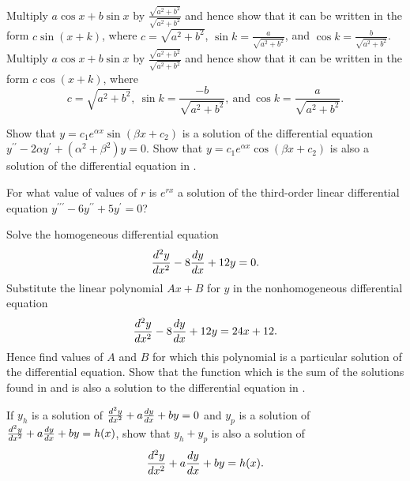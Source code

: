 \begin{exercises}
\begin{exenum}
\x
Multiply $a \cos x + b \sin x$ by
$\frac{\sqrt{a^2+b^2}}{\sqrt{a^2+b^2}}$
and hence show that it can be written in the form
$c \sin (x+k)$, where $c = \sqrt{a^2+b^2}$,
$\sin k = \frac a{\sqrt{a^2+b^2}}$, and
$\cos k = \frac b{\sqrt{a^2+b^2}}$.
\x
Multiply $a \cos x + b \sin x$ by
$\frac{\sqrt{a^2+b^2}}{\sqrt{a^2+b^2}}$
and hence show that it can be written in the form
$c \cos(x+k)$, where
\[
c = \sqrt{a^2+b^2},\:\sin k = \frac{-b}{\sqrt{a^2+b^2}},
\:\mbox{and}\: \cos k = \frac{a}{\sqrt{a^2+b^2}}
.
\]
\end{exenum}

\begin{exenum}
\x
{}
Show that $y = c_1e^{\alpha x}\sin(\beta x+c_2)$
is a solution of the differential equation
$y^{\prime\prime} - 2\alpha y^\prime +
(\alpha^2+\beta^2)y = 0$.
\x
Show that $y = c_1e^{\alpha x}\cos(\beta x+c_2)$
is also a solution of the differential equation
in .
\end{exenum}

For what value of values of $r$ is $e^{rx}$
a solution of the third-order linear differential
equation
$y^{\prime\prime\prime} -6y^{\prime\prime}
+ 5y^\prime = 0$?

\begin{exenum}
\x
{}
Solve the homogeneous differential equation
\[
\frac{d^{2}{y}}{dx^{2}} - 8 \frac{d y}{d x} + 12y = 0
.
\]
\x
{}
Substitute the linear polynomial $Ax+B$ for $y$
in the nonhomogeneous differential equation
\[
\frac{d^{2}{y}}{dx^{2}} - 8\frac{d y}{d x} + 12y = 24x + 12
.
\]
Hence find values of $A$ and $B$ for which
this polynomial is a particular solution
of the differential equation.
\x
Show that the function which is the sum of the
solutions found in  and
 is also a solution to the
differential equation in .
\end{exenum}

If $y_h$ is a solution of
$\frac{d^{2}{y}}{dx^{2}} + a \frac{d y}{d x} + by = 0$ and $y_p$
is a solution of
$\frac{d^{2}{y}}{dx^{2}} + a \frac{d y}{d x} + by = h(x)$,
show that $y_h + y_p$ is also a solution of
\[
\frac{d^{2}{y}}{dx^{2}} + a \frac{d y}{d x} + by = h(x)
.
\]

\end{exercises}
